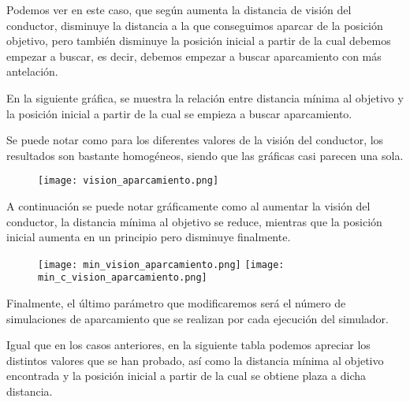 Podemos ver en este caso, que según aumenta la distancia de visión del conductor, disminuye la distancia a la que conseguimos aparcar de la posición objetivo, pero también disminuye la posición inicial a partir de la cual debemos empezar a buscar, es decir, debemos empezar a buscar aparcamiento con más antelación.

En la siguiente gráfica, se muestra la relación entre distancia mínima al objetivo y la posición inicial a partir de la cual se empieza a buscar aparcamiento.

Se puede notar como para los diferentes valores de la visión del conductor, los resultados son bastante homogéneos, siendo que las gráficas casi parecen una sola.

\begin{figure}[h]
\texttt{[image: vision\_aparcamiento.png]}
\centering
\end{figure}

\newpage

A continuación se puede notar gráficamente como al aumentar la visión del conductor, la distancia mínima al objetivo se reduce, mientras que la posición inicial aumenta en un principio pero disminuye finalmente.
\begin{figure}[h]
\texttt{[image: min\_vision\_aparcamiento.png]}
\texttt{[image: min\_c\_vision\_aparcamiento.png]}
\centering
\end{figure}

\newpage

Finalmente, el último parámetro que modificaremos será el número de simulaciones de aparcamiento que se realizan por cada ejecución del simulador.

Igual que en los casos anteriores, en la siguiente tabla podemos apreciar los distintos valores que se han probado, así como la distancia mínima al objetivo encontrada y la posición inicial a partir de la cual se obtiene plaza a dicha distancia.

\begin{table}[h]
\centering
{}
\end{table}

